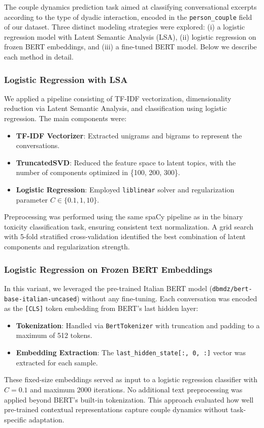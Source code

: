 \documentclass[conference]{IEEEtran}
\begin{document}
The couple dynamics prediction task aimed at classifying conversational excerpts according to the type of dyadic interaction, encoded in the \texttt{person\_couple} field of our dataset. Three distinct modeling strategies were explored: (i) a logistic regression model with Latent Semantic Analysis (LSA), (ii) logistic regression on frozen BERT embeddings, and (iii) a fine-tuned BERT model. Below we describe each method in detail.

\subsubsection{Logistic Regression with LSA}

We applied a pipeline consisting of TF-IDF vectorization, dimensionality reduction via Latent Semantic Analysis, and classification using logistic regression. The main components were:
\begin{itemize}
    \item \textbf{TF-IDF Vectorizer}: Extracted unigrams and bigrams to represent the conversations.
    \item \textbf{TruncatedSVD}: Reduced the feature space to latent topics, with the number of components optimized in \{100, 200, 300\}.
    \item \textbf{Logistic Regression}: Employed \texttt{liblinear} solver and regularization parameter \(C \in \{0.1, 1, 10\}\).
\end{itemize}
Preprocessing was performed using the same spaCy pipeline as in the binary toxicity classification task, ensuring consistent text normalization. A grid search with 5-fold stratified cross-validation identified the best combination of latent components and regularization strength.

\subsubsection{Logistic Regression on Frozen BERT Embeddings}

In this variant, we leveraged the pre-trained Italian BERT model (\texttt{dbmdz/bert-base-italian-uncased}) without any fine-tuning. Each conversation was encoded as the \texttt{[CLS]} token embedding from BERT's last hidden layer:
\begin{itemize}
    \item \textbf{Tokenization}: Handled via \texttt{BertTokenizer} with truncation and padding to a maximum of 512 tokens.
    \item \textbf{Embedding Extraction}: The \texttt{last\_hidden\_state[:, 0, :]} vector was extracted for each sample.
\end{itemize}
These fixed-size embeddings served as input to a logistic regression classifier with \(C=0.1\) and maximum 2000 iterations. No additional text preprocessing was applied beyond BERT's built-in tokenization. This approach evaluated how well pre-trained contextual representations capture couple dynamics without task-specific adaptation.
\end{document}
